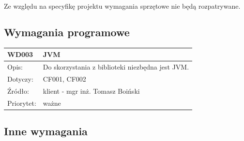 \documentclass[a4paper,10pt]{article}
\begin{document}

Ze względu na specyfikę projektu wymagania sprzętowe nie będą rozpatrywane.





\subsection{Wymagania programowe}


\begin{center}

\begin{tabular}{|m{3cm}|m{9cm}|} \hline

WD003 & JVM \\ \hline
Opis: & Do skorzystania z biblioteki niezbędna jest JVM.\\ \hline
Dotyczy: & CF001, CF002 \\ \hline
Źródło: & klient - mgr inż. Tomasz Boiński \\ \hline
Priorytet: & ważne \\ \hline

\end{tabular}

\end{center}

\subsection{Inne wymagania}
\end{document}
